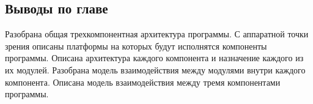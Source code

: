

\newpage
\subsection{Выводы по главе}
Разобрана общая трехкомпонентная архитектура программы. С аппаратной точки зрения описаны платформы на которых будут исполнятся компоненты программы. Описана архитектура каждого компонента и назначение каждого из их модулей. Разобрана модель взаимодействия между модулями внутри каждого компонента.
Описана модель взаимодействия между тремя компонентами программы.

